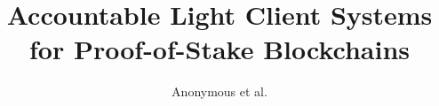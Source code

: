 \documentclass[runningheads]{llncs}
\begin{document}

\title{Accountable Light Client Systems for Proof-of-Stake Blockchains}
\author{Anonymous et al.}  
\maketitle











\end{document}
